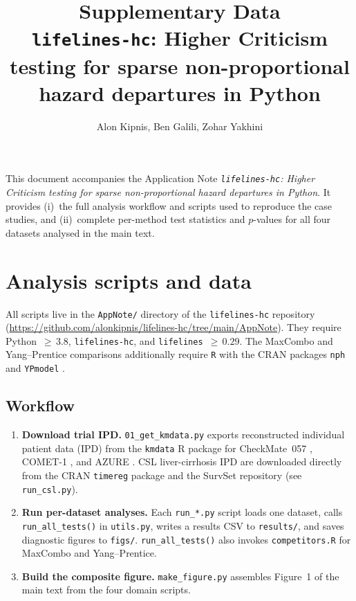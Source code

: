 \documentclass[11pt]{article}
\title{Supplementary Data\\[0.4em]
  \large\texttt{lifelines-hc}: Higher Criticism testing for sparse
  non-proportional hazard departures in Python}
\author{Alon Kipnis, Ben Galili, Zohar Yakhini}
\date{}
\begin{document}
\maketitle

\noindent
This document accompanies the Application Note
\textit{\texttt{lifelines-hc}: Higher Criticism testing for sparse
  non-proportional hazard departures in Python}.
It provides (i)~the full analysis workflow and scripts used to reproduce
the case studies, and (ii)~complete per-method test statistics and
$p$-values for all four datasets analysed in the main text.

\section{Analysis scripts and data}

All scripts live in the \texttt{AppNote/} directory of the
\texttt{lifelines-hc} repository
(\url{https://github.com/alonkipnis/lifelines-hc/tree/main/AppNote}).
They require Python~${\geq}\,3.8$, \texttt{lifelines-hc}, and
\texttt{lifelines}~${\geq}\,0.29$.
The MaxCombo and Yang--Prentice comparisons additionally require
\texttt{R} with the CRAN packages \texttt{nph} \citep{ristl2021nph}
and \texttt{YPmodel} \citep{yang2005,yang2010improved}.

\subsection*{Workflow}

\begin{enumerate}
  \item \textbf{Download trial IPD.}
        \texttt{01\_get\_kmdata.py} exports reconstructed individual patient
        data (IPD) from the \texttt{kmdata} R package
        \citep{guyot2012} for CheckMate~057 \citep{borghaei2015},
        COMET-1 \citep{smith2016}, and AZURE
        \citep{coleman2011,coleman2014}.
        CSL liver-cirrhosis IPD are downloaded directly from the CRAN
        \texttt{timereg} package and the SurvSet repository
        \citep{csl_data,survset2022} (see \texttt{run\_csl.py}).
  \item \textbf{Run per-dataset analyses.}
        Each \texttt{run\_*.py} script loads one dataset, calls
        \texttt{run\_all\_tests()} in \texttt{utils.py}, writes a results
        CSV to \texttt{results/}, and saves diagnostic figures to
        \texttt{figs/}.  \texttt{run\_all\_tests()} also invokes
        \texttt{competitors.R} for MaxCombo and Yang--Prentice.
  \item \textbf{Build the composite figure.}
        \texttt{make\_figure.py} assembles Figure~1 of the main text from
        the four domain scripts.
\end{enumerate}
\end{document}
